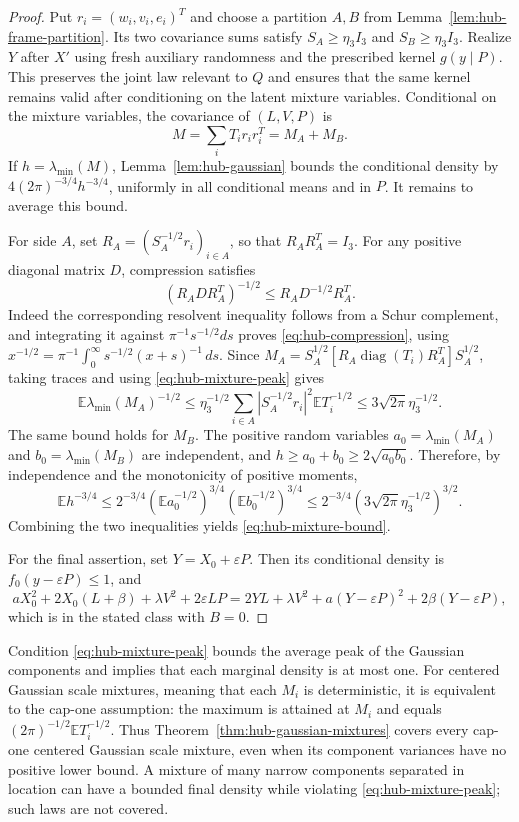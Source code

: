 \begin{proof}
Put $r_i=(w_i,v_i,e_i)^T$ and choose a partition $A,B$ from
Lemma~\ref{lem:hub-frame-partition}.  Its two covariance sums satisfy
$S_A\ge\eta_3I_3$ and $S_B\ge\eta_3I_3$.
Realize $Y$ after $X'$ using fresh auxiliary randomness and the
prescribed kernel $g(y\mid P)$.  This preserves the joint law relevant
to $Q$ and ensures that the same kernel remains valid after
conditioning on the latent mixture variables.
Conditional on the mixture variables, the covariance of $(L,V,P)$ is
\[
 M=\sum_iT_i r_i r_i^T=M_A+M_B.
\]
If $h=\lambda_{\min}(M)$, Lemma~\ref{lem:hub-gaussian} bounds the
conditional density by $4(2\pi)^{-3/4}h^{-3/4}$, uniformly in all
conditional means and in $P$.  It remains to average this bound.

For side $A$, set $R_A=(S_A^{-1/2}r_i)_{i\in A}$, so that
$R_AR_A^T=I_3$.  For any positive diagonal matrix $D$, compression
satisfies
\begin{equation}\label{eq:hub-compression}
 (R_ADR_A^T)^{-1/2}\le R_AD^{-1/2}R_A^T.
\end{equation}
Indeed the corresponding resolvent inequality follows from a Schur
complement, and integrating it against
$\pi^{-1}s^{-1/2}ds$ proves \eqref{eq:hub-compression}, using
$x^{-1/2}=\pi^{-1}\int_0^\infty s^{-1/2}(x+s)^{-1}\,ds$.
Since
$M_A=S_A^{1/2}[R_A\operatorname{diag}(T_i)R_A^T]S_A^{1/2}$,
taking traces and using \eqref{eq:hub-mixture-peak} gives
\[
 \mathbb E\lambda_{\min}(M_A)^{-1/2}
 \le\eta_3^{-1/2}\sum_{i\in A}
            |S_A^{-1/2}r_i|^2\mathbb ET_i^{-1/2}
 \le3\sqrt{2\pi}\eta_3^{-1/2}.
\]
The same bound holds for $M_B$.
The positive random variables
$a_0=\lambda_{\min}(M_A)$ and $b_0=\lambda_{\min}(M_B)$ are
independent, and $h\ge a_0+b_0\ge2\sqrt{a_0b_0}$.
Therefore, by independence and the monotonicity of positive moments,
\[
 \mathbb Eh^{-3/4}
 \le2^{-3/4}(\mathbb Ea_0^{-1/2})^{3/4}
                 (\mathbb Eb_0^{-1/2})^{3/4}
 \le2^{-3/4}(3\sqrt{2\pi}\eta_3^{-1/2})^{3/2}.
\]
Combining the two inequalities yields
\eqref{eq:hub-mixture-bound}.

For the final assertion, set $Y=X_0+\varepsilon P$.
Then its conditional density is $f_0(y-\varepsilon P)\le1$, and
\[
 aX_0^2+2X_0(L+\beta)+\lambda V^2+2\varepsilon LP
 =2YL+\lambda V^2+a(Y-\varepsilon P)^2
                         +2\beta(Y-\varepsilon P),
\]
which is in the stated class with $B=0$.
\end{proof}

\begin{remark}
Condition \eqref{eq:hub-mixture-peak} bounds the average peak of the
Gaussian components and implies that each marginal density is at most
one.  For centered Gaussian scale mixtures, meaning that each $M_i$
is deterministic, it is equivalent to the cap-one assumption: the
maximum is attained at $M_i$ and equals
$(2\pi)^{-1/2}\mathbb ET_i^{-1/2}$.
Thus Theorem~\ref{thm:hub-gaussian-mixtures} covers every cap-one
centered Gaussian scale mixture, even when its component variances
have no positive lower bound.  A mixture of many narrow components
separated in location can have a bounded final density while violating
\eqref{eq:hub-mixture-peak}; such laws are not covered.
\end{remark}

